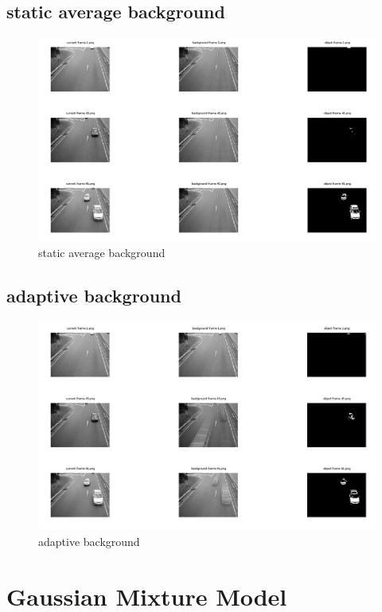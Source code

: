 \documentclass{article}
\begin{document}
	\subsection{static average background}
	\begin{figure}[H]
		\includegraphics[width=\linewidth]{Q2/partC/partC.png}
		\caption{static average background}
	\end{figure}
	
	\subsection{adaptive background}
	\begin{figure}[H]
		\includegraphics[width=\linewidth]{Q2/partD/partD.png}
		\caption{adaptive background}
	\end{figure}
	
	\newpage
	\section{Gaussian Mixture Model}
	
\end{document}

